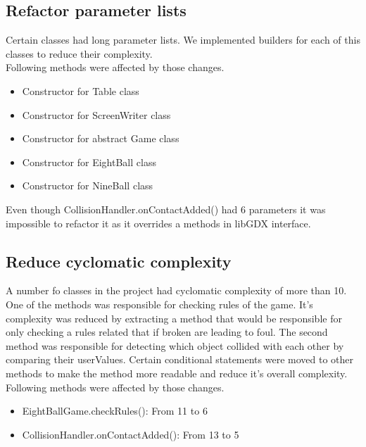 \documentclass{article}
\begin{document}
	\subsection{Refactor parameter lists}
	Certain classes had long parameter lists. We implemented builders for each of this classes to reduce their complexity.
	\\Following methods were affected by those changes.
	\begin{itemize}
		\item Constructor for Table class
		\item Constructor for ScreenWriter class
		\item Constructor for abstract Game class
		\item Constructor for EightBall class
		\item Constructor for NineBall class
	\end{itemize}
Even though CollisionHandler.onContactAdded() had 6 parameters it was impossible to refactor it as it overrides a methods in libGDX interface.
	\subsection{Reduce cyclomatic complexity}
	A number fo classes in the project had cyclomatic complexity of more than 10. One of the methods was responsible for checking rules of the game. It's complexity was reduced by extracting a method that would be responsible for only checking a rules related that if broken are leading to foul. The second method was responsible for detecting which object collided with each other by comparing their userValues. Certain conditional statements were moved to other methods to make the method more readable and reduce it's overall complexity. 
	\\Following methods were affected by those changes.
	\begin{itemize}
		\item EightBallGame.checkRules(): From 11 to 6
		\item CollisionHandler.onContactAdded(): From 13 to 5
	\end{itemize}
\end{document}
